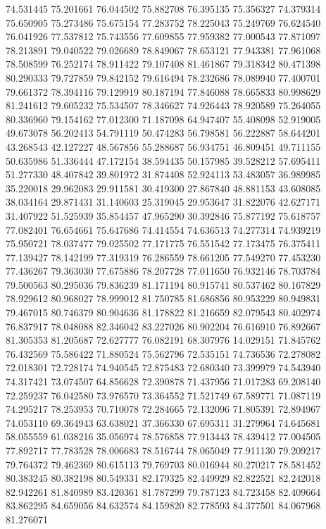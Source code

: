 74.531445
75.201661
76.044502
75.882708
76.395135
75.356327
74.379314
75.650905
75.273486
75.675154
77.283752
78.225043
75.249769
76.624540
76.041926
77.537812
75.743556
77.609855
77.959382
77.000543
77.871097
78.213891
79.040522
79.026689
78.849067
78.653121
77.943381
77.961068
78.508599
76.252174
78.911422
79.107408
81.461867
79.318342
80.471398
80.290333
79.727859
79.842152
79.616494
78.232686
78.089940
77.400701
79.661372
78.394116
79.129919
80.187194
77.846088
78.665833
80.998629
81.241612
79.605232
75.534507
78.346627
74.926443
78.920589
75.264055
80.336960
79.154162
77.012300
71.187098
64.947407
55.408098
52.919005
49.673078
56.202413
54.791119
50.474283
56.798581
56.222887
58.644201
43.268543
42.127227
48.567856
55.288687
56.934751
46.809451
49.711155
50.635986
51.336444
47.172154
38.594435
50.157985
39.528212
57.695411
51.277330
48.407842
39.801972
31.874408
52.924113
53.483057
36.989985
35.220018
29.962083
29.911581
30.419300
27.867840
48.881153
43.608085
38.034164
29.871431
31.140603
25.319045
29.953647
31.822076
42.627171
31.407922
51.525939
35.854457
47.965290
30.392846
75.877192
75.618757
77.082401
76.654661
75.647686
74.414554
74.636513
74.277314
74.939219
75.950721
78.037477
79.025502
77.171775
76.551542
77.173475
76.375411
77.139427
78.142199
77.319319
76.286559
78.661205
77.549270
77.453230
77.436267
79.363030
77.675886
78.207728
77.011650
76.932146
78.703784
79.500563
80.295036
79.836239
81.171194
80.915741
80.537462
80.167829
78.929612
80.968027
78.999012
81.750785
81.686856
80.953229
80.949831
79.467015
80.746379
80.904636
81.178822
81.216659
82.079543
80.402974
76.837917
78.048088
82.346042
83.227026
80.902204
76.616910
76.892667
81.305353
81.205687
72.627777
76.082191
68.307976
14.029151
71.845762
76.432569
75.586422
71.880524
75.562796
72.535151
74.736536
72.278082
72.018301
72.728174
74.940545
72.875483
72.680340
73.399979
74.543940
74.317421
73.074507
64.856628
72.390878
71.437956
71.017283
69.208140
72.259237
76.042580
73.976570
73.364552
71.521749
67.589771
71.087119
74.295217
78.253953
70.710078
72.284665
72.132096
71.805391
72.894967
74.053110
69.364943
63.638021
37.366330
67.695311
31.279964
74.645681
58.055559
61.038216
35.056974
78.576858
77.913443
78.439412
77.004505
77.892717
77.783528
78.006683
78.516744
78.065049
77.911130
79.209217
79.764372
79.462369
80.615113
79.769703
80.016944
80.270217
78.581452
80.383245
80.382198
80.549331
82.179325
82.449929
82.822521
82.242018
82.942261
81.840989
83.420361
81.787299
79.787123
84.723458
82.409664
83.862295
84.659056
84.632574
84.159820
82.778593
84.377501
84.067968
81.276071
